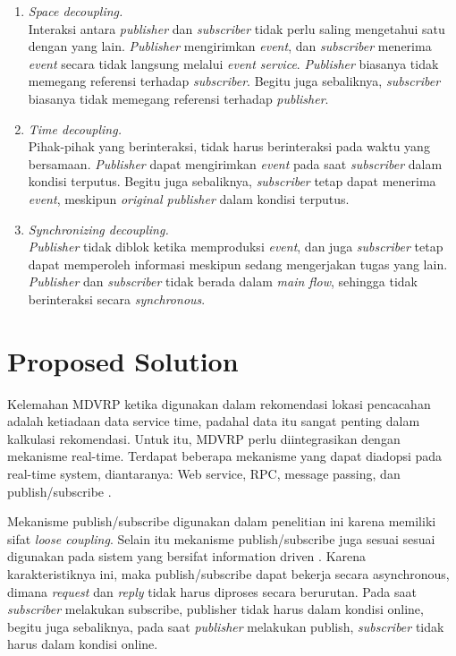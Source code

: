 \documentclass[conference]{IEEEtran}
\begin{document}
\begin{enumerate}
\item \textit{Space decoupling.} \\
Interaksi antara \textit{publisher} dan \textit{subscriber} tidak perlu saling mengetahui satu dengan yang lain. \textit{Publisher} mengirimkan \textit{event}, dan \textit{subscriber} menerima \textit{event} secara tidak langsung melalui \textit{event service}. \textit{Publisher} biasanya tidak memegang referensi terhadap \textit{subscriber}. Begitu juga sebaliknya, \textit{subscriber} biasanya tidak memegang referensi terhadap \textit{publisher}.
\item \textit{Time decoupling.} \\
Pihak-pihak yang berinteraksi, tidak harus berinteraksi pada waktu yang bersamaan. \textit{Publisher} dapat mengirimkan \textit{event} pada saat \textit{subscriber} dalam kondisi terputus. Begitu juga sebaliknya, \textit{subscriber} tetap dapat menerima \textit{event}, meskipun \textit{original publisher} dalam kondisi terputus.
\item \textit{Synchronizing decoupling.} \\
\textit{Publisher} tidak diblok ketika memproduksi \textit{event}, dan juga \textit{subscriber} tetap dapat memperoleh informasi meskipun sedang mengerjakan tugas yang lain. \textit{Publisher} dan \textit{subscriber} tidak berada dalam \textit{main flow}, sehingga tidak berinteraksi secara \textit{synchronous}.
\end{enumerate}


\section{Proposed Solution}
\label{sec:proposed-solution}
Kelemahan MDVRP ketika digunakan dalam rekomendasi lokasi pencacahan adalah ketiadaan data service time, padahal data itu sangat penting dalam kalkulasi rekomendasi. Untuk itu, MDVRP perlu diintegrasikan dengan mekanisme real-time. Terdapat beberapa mekanisme yang dapat diadopsi pada real-time system, diantaranya: Web service, RPC, message passing, dan publish/subscribe \cite{eugster_many_2003}. 


Mekanisme publish/subscribe digunakan dalam penelitian ini karena memiliki sifat \textit{loose coupling}. Selain itu mekanisme publish/subscribe juga sesuai sesuai digunakan pada sistem yang bersifat information driven \cite{muhl_large-scale_2002}. Karena karakteristiknya ini, maka publish/subscribe dapat bekerja secara asynchronous, dimana \textit{request} dan \textit{reply} tidak harus diproses secara berurutan. Pada saat \textit{subscriber} melakukan subscribe, publisher tidak harus dalam kondisi online, begitu juga sebaliknya, pada saat \textit{publisher} melakukan publish, \textit{subscriber} tidak harus dalam kondisi online.
\end{document}
